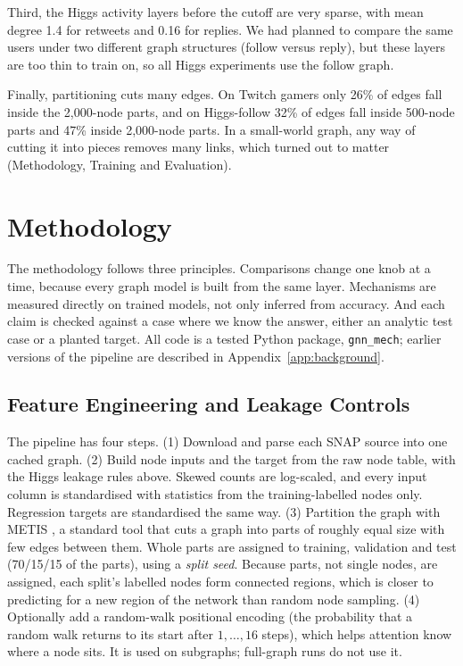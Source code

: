Third, the Higgs activity layers before the cutoff are very sparse, with mean degree 1.4 for retweets and 0.16 for replies. We had planned to compare the same users under two different graph structures (follow versus reply), but these layers are too thin to train on, so all Higgs experiments use the follow graph.

Finally, partitioning cuts many edges. On Twitch gamers only 26\% of edges fall inside the 2,000-node parts, and on Higgs-follow 32\% of edges fall inside 500-node parts and 47\% inside 2,000-node parts. In a small-world graph, any way of cutting it into pieces removes many links, which turned out to matter (Methodology, Training and Evaluation).

\section{Methodology}
The methodology follows three principles. Comparisons change one knob at a time, because every graph model is built from the same layer. Mechanisms are measured directly on trained models, not only inferred from accuracy. And each claim is checked against a case where we know the answer, either an analytic test case or a planted target. All code is a tested Python package, \texttt{gnn\_mech}; earlier versions of the pipeline are described in Appendix~\ref{app:background}.

\subsection{Feature Engineering and Leakage Controls}
The pipeline has four steps. (1) Download and parse each SNAP source into one cached graph. (2) Build node inputs and the target from the raw node table, with the Higgs leakage rules above. Skewed counts are log-scaled, and every input column is standardised with statistics from the training-labelled nodes only. Regression targets are standardised the same way. (3) Partition the graph with METIS \citep{f_karypis1998}, a standard tool that cuts a graph into parts of roughly equal size with few edges between them. Whole parts are assigned to training, validation and test (70/15/15 of the parts), using a \emph{split seed}. Because parts, not single nodes, are assigned, each split's labelled nodes form connected regions, which is closer to predicting for a new region of the network than random node sampling. (4) Optionally add a random-walk positional encoding (the probability that a random walk returns to its start after $1,\dots,16$ steps), which helps attention know where a node sits. It is used on subgraphs; full-graph runs do not use it.

